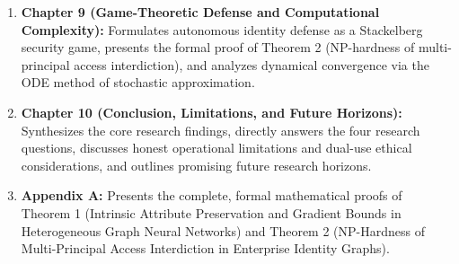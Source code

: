\begin{enumerate}
    \item \textbf{Chapter 9 (Game-Theoretic Defense and Computational Complexity):} Formulates autonomous identity defense as a Stackelberg security game, presents the formal proof of Theorem 2 (NP-hardness of multi-principal access interdiction), and analyzes dynamical convergence via the ODE method of stochastic approximation.
    \item \textbf{Chapter 10 (Conclusion, Limitations, and Future Horizons):} Synthesizes the core research findings, directly answers the four research questions, discusses honest operational limitations and dual-use ethical considerations, and outlines promising future research horizons.
    \item \textbf{Appendix A:} Presents the complete, formal mathematical proofs of Theorem 1 (Intrinsic Attribute Preservation and Gradient Bounds in Heterogeneous Graph Neural Networks) and Theorem 2 (NP-Hardness of Multi-Principal Access Interdiction in Enterprise Identity Graphs).
\end{enumerate}
